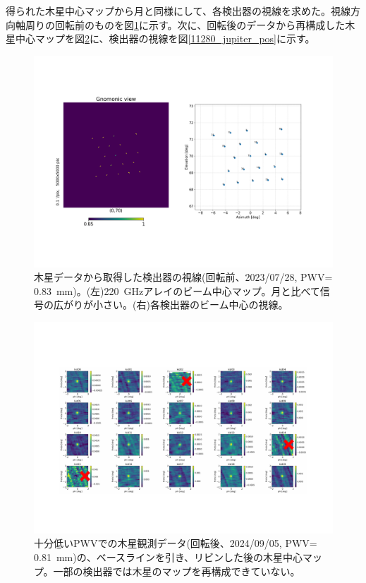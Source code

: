 得られた木星中心マップから月と同様にして、各検出器の視線を求めた。視線方向軸周りの回転前のものを図\ref{5987_jupiter_pos}に示す。次に、回転後のデータから再構成した木星中心マップを図\ref{11280_jupiter_mod}に、検出器の視線を図\ref{11280_jupiter_pos}に示す。
\begin{figure}[htbp]
  \centering
  \includegraphics[width=1.0\columnwidth]{5_alignment/figs/5987_jupiter_pos.pdf}
  \caption{木星データから取得した検出器の視線(回転前、2023/07/28, PWV= \SI{0.83}{mm})。(左)\SI{220}{GHz}アレイのビーム中心マップ。月と比べて信号の広がりが小さい。(右)各検出器のビーム中心の視線。}
  \label{5987_jupiter_pos}
\end{figure}
\begin{figure}[htbp]
  \centering
  \includegraphics[width=0.8\columnwidth]{5_alignment/figs/11280_jupiter_mod.pdf}
  \caption{十分低いPWVでの木星観測データ(回転後、2024/09/05, PWV= \SI{0.81}{mm})の、ベースラインを引き、リビンした後の木星中心マップ。一部の検出器では木星のマップを再構成できていない。}
  \label{11280_jupiter_mod}
\end{figure}
